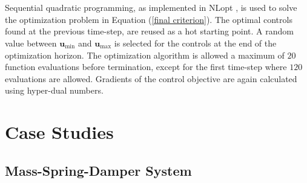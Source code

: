 \\
\\
Sequential quadratic programming, as implemented in NLopt \parencite{johnson}, is used to solve the optimization problem \parencite{kraft,kraft2} in Equation (\ref{final criterion}). The optimal controls found at the previous time-step, are reused as a hot starting point. A random value between $\bm u_\text{min}$ and $\bm u_\text{max}$ is selected for the controls at the end of the optimization horizon. The optimization algorithm is allowed a maximum of $20$ function evaluations before termination, except for the first time-step where $120$ evaluations are allowed. Gradients of the control objective are again calculated using hyper-dual numbers. 
\section{Case Studies}
\subsection{Mass-Spring-Damper System}
